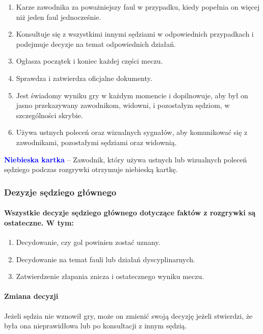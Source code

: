 \documentclass[12pt]{article}
\newcommand\bluecard[1]{\bgroup\textcolor{blue}{\textbf{#1}}}
\begin{document}
\begin{enumerate}
	\item Karze zawodnika za poważniejszy faul w przypadku, kiedy popełnia on
	      więcej niż jeden faul jednocześnie.

	\item Konsultuje się z wszystkimi innymi sędziami w odpowiednich
	      przypadkach i podejmuje decyzje na temat odpowiednich działań.

	\item Ogłasza początek i koniec każdej części meczu.

	\item Sprawdza i zatwierdza oficjalne dokumenty.

	\item Jest świadomy wyniku gry w każdym momencie i dopilnowuje, aby był on
	      jasno przekazywany zawodnikom, widowni, i pozostałym sędziom, w
	      szczególności skrybie.

	\item Używa ustnych poleceń oraz wizualnych sygnałów, aby komunikować się z
	      zawodnikami, pozostałymi sędziami oraz widownią.
\end{enumerate}

\bluecard{Niebieska kartka} -- Zawodnik, który używa ustnych lub wizualnych
poleceń sędziego podczas rozgrywki otrzymuje niebieską kartkę.

\subsubsection{Dezyzje sędziego głównego}

\paragraph{Wszystkie decyzje sędziego głównego dotyczące faktów z
	rozgrywki są ostateczne. W tym:}
\begin{enumerate}
	\item Decydowanie, czy gol powinien zostać uznany.

	\item Decydowanie na temat fauli lub działań dyscyplinarnych.

	\item Zatwierdzenie złapania znicza i ostatecznego wyniku meczu.
\end{enumerate}

\paragraph{Zmiana decyzji}
Jeżeli sędzia nie wznowił gry, może
on zmienić swoją decyzję jeżeli stwierdzi, że była ona nieprawidłowa lub
po konsultacji z innym sędzią.
\end{document}
